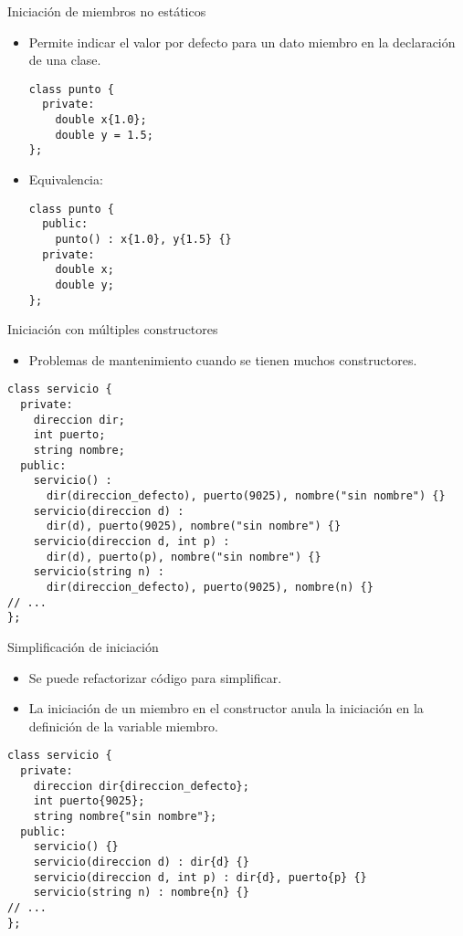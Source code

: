 \begin{frame}[fragile]{Iniciación de miembros no estáticos}
\begin{itemize}
  \item Permite indicar el valor por defecto para un dato miembro en la declaración de una clase.
\begin{lstlisting}
class punto {
  private:
    double x{1.0};
    double y = 1.5;
};
\end{lstlisting}
  \item Equivalencia:
\begin{lstlisting}
class punto {
  public:
    punto() : x{1.0}, y{1.5} {}
  private:
    double x;
    double y;
};
\end{lstlisting}
\end{itemize}
\end{frame}

\begin{frame}[fragile]{Iniciación con múltiples constructores}
\begin{itemize}
  \item Problemas de mantenimiento cuando se tienen muchos constructores.
\end{itemize}
\begin{lstlisting}
class servicio {
  private:
    direccion dir;
    int puerto;
    string nombre;
  public:
    servicio() :
      dir(direccion_defecto), puerto(9025), nombre("sin nombre") {}
    servicio(direccion d) :
      dir(d), puerto(9025), nombre("sin nombre") {}
    servicio(direccion d, int p) :
      dir(d), puerto(p), nombre("sin nombre") {}
    servicio(string n) :
      dir(direccion_defecto), puerto(9025), nombre(n) {}
// ...
};
\end{lstlisting}
\end{frame}

\begin{frame}[fragile]{Simplificación de iniciación}
\begin{itemize}
  \item Se puede refactorizar código para simplificar.
  \item La iniciación de un miembro en el constructor anula la iniciación en la definición
        de la variable miembro.
\end{itemize}
\begin{lstlisting}
class servicio {
  private:
    direccion dir{direccion_defecto};
    int puerto{9025};
    string nombre{"sin nombre"};
  public:
    servicio() {}
    servicio(direccion d) : dir{d} {}
    servicio(direccion d, int p) : dir{d}, puerto{p} {}
    servicio(string n) : nombre{n} {}
// ...
};
\end{lstlisting}
\end{frame}

